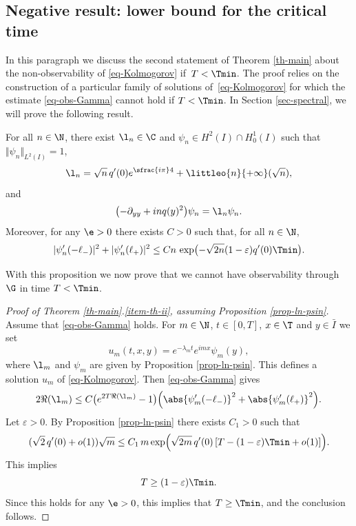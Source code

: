\subsection{Negative result: lower bound for the critical time}

In this paragraph we discuss the second statement of Theorem \ref{th-main} about the non-observability of \eqref{eq-Kolmogorov} if~$T < \Tmin$. The proof relies on the construction of a particular family of solutions of~\eqref{eq-Kolmogorov} for which the estimate \eqref{eq-obs-Gamma} cannot hold if $T < \Tmin$. In Section \ref{sec-spectral}, we will prove the following result.

\begin {proposition}\label{prop-ln-psin}
For all $n \in \N$, there exist $\l_n \in \C$ and $\psi_n \in H^2(I) \cap H_0^1(I)$ such that $\Vert \psi_n \Vert_{L^2(I)} = 1$,
\begin{equation} \label{eq-lambda-n}
\l_n = \sqrt n\, q'(0) e^{\sfrac {i\pi}4} + \littleo{n}{+\infty}(\sqrt n),
\end{equation}
and
\[
\bigl(-\partial_{yy} + inq(y)^2 \bigr)\psi_n = \l_n \psi_n.
\]
Moreover, for any $\e > 0$ there exists $C > 0$ such that, for all $n \in \N$,
\begin{equation} \label{eq-Agmon-psi-n}
\vert \psi_n'(-\ell_-) \vert^2 + \vert \psi_n'(\ell_+) \vert^2 \leq
C n\, \exp\bigl(-\sqrt{2n}(1-\varepsilon) q'(0) \Tmin \bigr).
\end{equation}
\end{proposition}

With this proposition we now prove that we cannot have observability through $\G$ in time $T < \Tmin$.

\begin{proof}[Proof of Theorem \ref{th-main}.\eqref{item-th-ii}, assuming Proposition \ref{prop-ln-psin}]
Assume that \eqref{eq-obs-Gamma} holds. For $m \in \N$, $t \in [0,T]$, $x \in \T$ and $y \in \bar I$ we set
\[
u_m(t,x,y) = e^{-\lambda_m t} e^{i m x} \psi_m(y),
\]
where $\l_m$ and $\psi_m$ are given by Proposition \ref{prop-ln-psin}. This defines a solution $u_m$ of \eqref{eq-Kolmogorov}. Then \eqref{eq-obs-Gamma} gives
\[
2 \Re(\l_m) \leq C \bigl(e^{2T \Re(\l_m)}-1\bigr) \Bigl(\abs{\psi_m'(-\ell_-)}^2 + \abs{\psi_m'(\ell_+)}^2 \Bigr).
\]
Let $\varepsilon > 0$. By Proposition \ref{prop-ln-psin} there exists $C_1 > 0$ such that
\[
(\sqrt{2}\, q'(0) + o(1))\sqrt{m} \leq C_1 \, m \exp\Bigl(\sqrt{2m}\, q'(0) \left[ T - (1-\varepsilon) \Tmin + o(1) \right] \Bigr).
\]
This implies
\[
T \geq (1-\varepsilon) \Tmin.
\]
Since this holds for any $\e > 0$, this implies that $T \geq \Tmin$, and the conclusion follows.
\end{proof}

